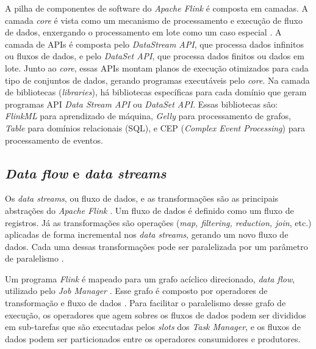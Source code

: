 
A pilha de componentes de software do \emph{Apache Flink} é composta em camadas.
A camada \emph{core} é vista como um mecanismo de processamento e execução de
fluxo de dados, enxergando o processamento em lote como um caso especial
\cite{Lopez2018,Carbone2015}.
A camada de APIs é composta pelo \emph{DataStream API}, que processa dados
infinitos ou fluxos de dados, e pelo \emph{DataSet API}, que processa dados
finitos ou dados em lote.
Junto ao \emph{core}, essas APIs montam planos de execução otimizados para cada
tipo de conjuntos de dados, gerando programas executáveis pelo \emph{core}.
Na camada de bibliotecas (\emph{libraries}), há bibliotecas específicas para
cada domínio que geram programas API \emph{Data Stream API} ou \emph{DataSet
API}.
Essas bibliotecas são: \emph{FlinkML} para aprendizado de máquina, \emph{Gelly}
para processamento de grafos, \emph{Table} para domínios relacionais (SQL), e
CEP (\emph{Complex Event Processing}) para processamento de eventos.


\subsection{\emph{Data flow} e \emph{data streams}}

Os \emph{data streams}, ou fluxo de dados, e as transformações são as principais
abstrações do \emph{Apache Flink} \cite{Lopez2018,ApacheFlink2020}.
Um fluxo de dados é definido como um fluxo de registros.
Já as transformações são operações (\emph{map, filtering, reduction, join},
etc.) aplicadas de forma incremental nos \emph{data streams}, gerando um novo
fluxo de dados.
Cada uma dessas transformações pode ser paralelizada por um parâmetro de
paralelismo \cite{Lopez2018}.

Um programa \emph{Flink} é mapeado para um grafo acíclico direcionado, \emph{data
flow}, utilizado pelo \emph{Job Manager} \cite{Carbone2015}.
Esse grafo é composto por operadores de transformação e fluxo de dados
\cite{ApacheFlink2020}.
Para facilitar o paralelismo desse grafo de execução, os operadores que agem
sobres os fluxos de dados podem ser divididos em sub-tarefas que são executadas
pelos \emph{slots} dos \emph{Task Manager}, e os fluxos de dados podem ser
particionados entre os operadores consumidores e produtores.

